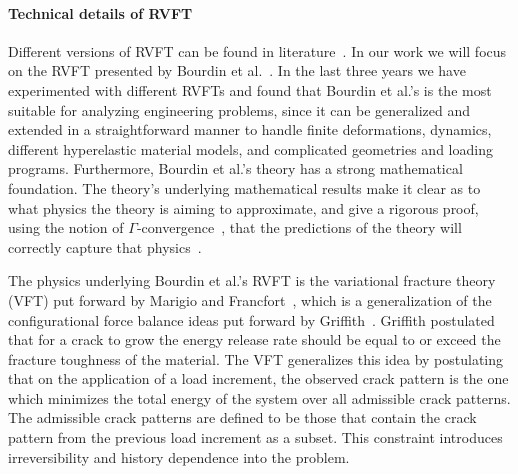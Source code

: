 \documentclass[10pt,letterpaper]{article}
\begin{document}
                    \begin{mdframed}
                       \paragraph{Technical details of RVFT}
                       Different versions of RVFT can be found in literature~\cite{bourdin_2008,hakim_2009}.
                       In our work we will focus on the RVFT presented by Bourdin et al.~\cite{bourdin2000numerical, bourdin_2008}.
                       In the last three years we have experimented with different RVFTs and found that Bourdin et al.'s is the most suitable for analyzing engineering problems, since it can be generalized and extended in a straightforward manner to handle finite deformations, dynamics, different hyperelastic material models, and complicated geometries and loading programs. Furthermore, Bourdin et al.'s theory has a  strong mathematical foundation.
                       The theory's underlying mathematical results make it clear as to what physics the theory is aiming to approximate, and give a rigorous proof, using the notion of $\mathit \Gamma$-convergence~\cite{braides2002gamma},  that the predictions of the theory will correctly capture that physics~\cite{chambolle_2005, ambrosio_1990b}.

                       The physics underlying Bourdin et al.'s RVFT is the variational fracture theory (VFT) put forward by Marigio and Francfort~\cite{francfort_1998}, which is a generalization of the configurational force balance ideas put forward by Griffith~\cite{griffith1921phenomena}. Griffith postulated that for a crack to grow the energy release rate should be equal to or exceed the fracture toughness of the material. The VFT generalizes this idea by postulating that on the application of a load increment, the observed crack pattern is the one which minimizes the total energy of the system over all admissible crack patterns. The admissible crack patterns are defined to be those that contain the crack pattern from the previous load increment as a subset. This constraint introduces irreversibility and history dependence into the problem.


\end{mdframed}
\end{document}

